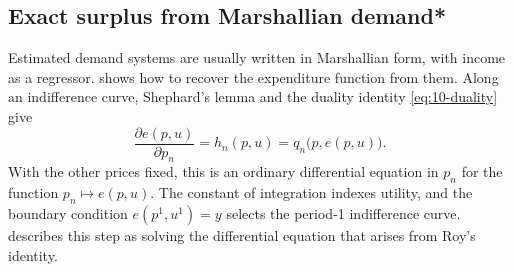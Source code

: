 \subsection{Exact surplus from Marshallian demand*}\label{sec:10-exact}

Estimated demand systems are usually written in Marshallian form, with income as a regressor.
\citet{Hausman1981} shows how to recover the expenditure function from them. Along an indifference curve,
Shephard's lemma and the duality identity \eqref{eq:10-duality} give
\begin{equation}\label{eq:10-hausman-ode}
  \frac{\partial e(p,u)}{\partial p_n} = h_n(p,u) = q_n\bigl(p,e(p,u)\bigr).
\end{equation}
With the other prices fixed, this is an ordinary differential equation in $p_n$ for the function
$p_n \mapsto e(p,u)$. The constant of integration indexes utility, and the boundary condition
$e(p^1,u^1) = y$ selects the period-1 indifference curve. \citet[p.~212 and n.~6]{Hausman1997} describes this
step as solving the differential equation that arises from Roy's identity.

